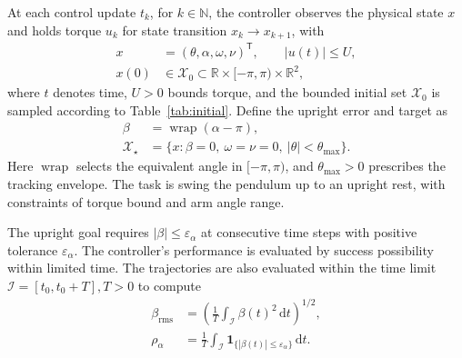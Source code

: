 \documentclass[letterpaper,10pt,conference]{ieeeconf}
\newcommand{\dd}{\mathrm{d}}
\newcommand{\ind}{\mathbf{1}}
\begin{document}
At each control update $t_k$, for $k\in\mathbb{N}$, the controller observes the physical state $x$ and holds torque $u_k$ for state transition $x_k\rightarrow x_{k+1}$, with
\begin{equation}
\begin{aligned}
 x&=(\theta,\alpha,\omega,\nu)^{\mathsf T},\qquad |u(t)|\le U,\\
 x(0)&\in\mathcal X_0\subset\mathbb R\times[-\pi,\pi)\times\mathbb R^2,
\end{aligned}
\label{eq:state}
\end{equation}
where $t$ denotes time, $U>0$ bounds torque, and the bounded initial set $\mathcal X_0$ is sampled according to Table~\ref{tab:initial}. Define the upright error and target as
\begin{equation}
\begin{aligned}
 \beta&=\operatorname{wrap}(\alpha-\pi),\\
 \mathcal X_\star&=\{x:\beta=0,\ \omega=\nu=0,\ |\theta|<\theta_{\max}\}.
\end{aligned}
\label{eq:target}
\end{equation}
Here $\operatorname{wrap}$ selects the equivalent angle in $[-\pi,\pi)$, and $\theta_{\max}>0$ prescribes the tracking envelope. The task is swing the pendulum up to an upright rest, with constraints of torque bound and arm angle range.

The upright goal requires $|\beta|\le\varepsilon_\alpha$ at consecutive time steps with positive tolerance $\varepsilon_\alpha$. The controller's performance is evaluated by success possibility within limited time. The trajectories are also evaluated within the time limit $\mathcal I=[t_0,t_0+T], T>0$ to compute
\begin{equation}
\begin{aligned}
 \beta_{\mathrm{rms}}&=\left(\frac{1}{T}\int_{\mathcal I}\beta(t)^2\,\dd t\right)^{1/2},\\
 \rho_\alpha&=\frac{1}{T}\int_{\mathcal I}\ind_{\{|\beta(t)|\leq\varepsilon_\alpha\}}\,\dd t.
\end{aligned}
\label{eq:holdingmetrics}
\end{equation}
\end{document}
